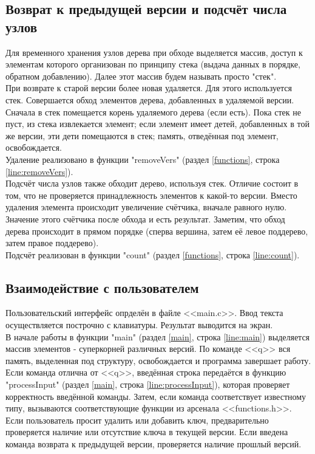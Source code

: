 \documentclass[zuev-23631-2-report.tex]{subfiles}
\begin{document}
\subsection{Возврат к предыдущей версии и подсчёт числа узлов}

Для временного хранения узлов дерева при обходе выделяется массив, доступ к элементам которого организован по принципу стека (выдача данных в порядке, обратном добавлению). Далее этот массив будем называть просто "стек".\\
При возврате к старой версии более новая удаляется. Для этого используется стек. Совершается обход элементов дерева, добавленных в удаляемой версии. Сначала в стек помещается корень удаляемого дерева (если есть). Пока стек не пуст, из стека извлекается элемент; если элемент имеет детей, добавленных в той же версии, эти дети помещаются в стек; память, отведённая под элемент, освобождается.\\
Удаление реализовано в функции "removeVers"\hspace{0pt} (раздел \ref{functions}, строка \ref{line:removeVers}). \\
Подсчёт числа узлов также обходит дерево, используя стек. Отличие состоит в том, что не проверяется принадлежность элементов к какой-то версии. Вместо удаления элемента происходит увеличение счётчика, вначале равного нулю. Значение этого счётчика после обхода и есть результат. Заметим, что обход дерева происходит в прямом порядке (сперва вершина, затем её левое поддерево, затем правое поддерево).\\
Подсчёт реализован в функции "count"\hspace{0pt} (раздел \ref{functions}, строка \ref{line:count}). \\

\subsection{Взаимодействие с пользователем}

Пользовательский интерфейс опрделён в файле <<main.c>>. Ввод текста осуществляется построчно с клавиатуры. Результат выводится на экран.\\
В начале работы  в функции "main"\hspace{0pt} (раздел \ref{main}, строка \ref{line:main}) выделяется массив элементов - суперкорней различных версий. По команде <<q>> вся память, выделенная под структуру, освобождается и программа завершает работу. Если команда отлична от <<q>>, введённая строка передаётся в функцию "processInput"\hspace{0pt} (раздел \ref{main}, строка \ref{line:processInput}), которая проверяет корректность введённой команды. Затем, если команда соответствует известному типу, вызываются соответствующие функции из арсенала <<functions.h>>. Если пользователь просит удалить или добавить ключ, предварительно проверяется наличие или отсутствие ключа в текущей версии. Если введена команда возврата к предыдущей версии, проверяется наличие прошлый версий.
\end{document}

